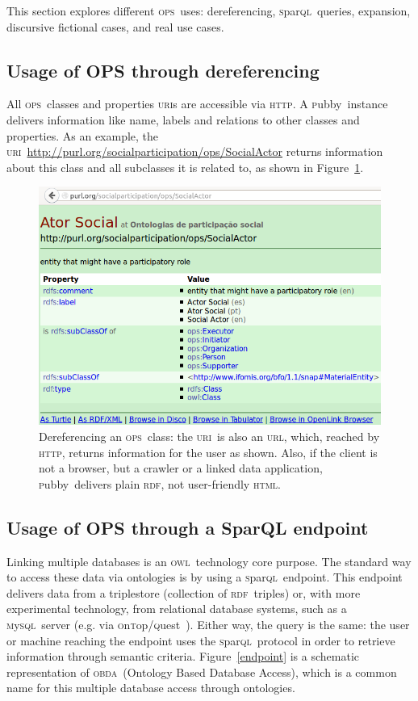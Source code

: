 \documentclass[10pt,letterpaper]{article}
\newcommand{\ops}{\textsc{ops}}
\newcommand{\owl}{\textsc{owl}}
\newcommand{\sparql}{\textsc{s}par\textsc{ql}}
\newcommand{\html}{\textsc{html}}
\newcommand{\uri}{\textsc{uri}}
\newcommand{\urll}{\textsc{url}}
\newcommand{\http}{\textsc{http}}
\newcommand{\pubby}{\textsc{p}ubby}
\newcommand{\rdf}{\textsc{rdf}}
\newcommand{\mysql}{\textsc{m}y\textsc{sql}}
\newcommand{\ontop}{\textsc{o}n\textsc{t}op}
\newcommand{\quest}{\textsc{q}uest}
\newcommand{\obda}{\textsc{obda}}
\begin{document}
This section explores different \ops\ uses: dereferencing, \sparql\ queries, expansion, discursive fictional cases, and real use cases.

\subsection{Usage of OPS through dereferencing}

All \ops\ classes and properties \uri s are accessible via \http. A \pubby\ instance delivers information like name, labels and relations to other classes and properties. As an example, the \uri\ \url{http://purl.org/socialparticipation/ops/SocialActor} returns information about this class and all subclasses it is related to, as shown in Figure~\ref{fig:deref}.

\begin{figure}[!h]
    \centering
    \includegraphics[width=\columnwidth]{figs/pubbyDer}
    \caption{Dereferencing an \ops\ class: the \uri\ is also an \urll, which, reached by \http, returns information for the user as shown. Also, if the client is not a browser, but a crawler or a linked data application, \pubby\ delivers plain \rdf, not user-friendly \html.}
    \label{fig:deref}
\end{figure}

\subsection{Usage of OPS through a SparQL endpoint}

Linking multiple databases is an \owl\ technology core purpose. The standard way to access these data via ontologies is by using a \sparql\ endpoint. This endpoint delivers data from a triplestore (collection of \rdf\ triples) or, with more experimental technology, from relational database systems, such as a \mysql\ server (e.g. via \ontop/\quest~\cite{onTop}). Either way, the query is the same: the user or machine reaching the endpoint uses the \sparql\ protocol in order to retrieve information through semantic criteria. Figure~\ref{endpoint} is a schematic representation of \obda\ (Ontology Based Database Access), which is a common name for this multiple database access through ontologies.
\end{document}
